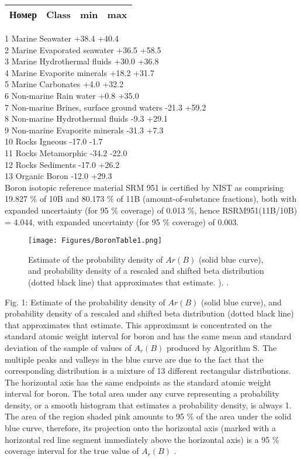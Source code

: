 \documentclass[a5paper,openany]{book}
\begin{document}
\begin{tabular}{cccc}
	Номер & Class &
	min & max \\
	\hline
\end{tabular}
1 Marine Seawater +38.4 +40.4 \\
2 Marine Evaporated seawater +36.5 +58.5\\
3 Marine Hydrothermal fluids +30.0 +36.8\\
4 Marine Evaporite minerals +18.2 +31.7\\
5 Marine Carbonates +4.0 +32.2\\
6 Non-marine Rain water +0.8 +35.0\\
7 Non-marine Brines, surface ground waters -21.3 +59.2\\
8 Non-marine Hydrothermal fluids -9.3 +29.1\\
9 Non-marine Evaporite minerals -31.3 +7.3\\
10 Rocks Igneous -17.0 -1.7\\
11 Rocks Metamorphic -34.2 -22.0\\
12 Rocks Sediments -17.0 +26.2\\
13 Organic Boron -12.0 +29.3\\

Boron isotopic reference material SRM 951 is certified by NIST as comprising 19.827 \% of 10B and 80.173 \% of 11B (amount-of-substance
fractions), both with expanded uncertainty (for 95 \% coverage) of 0.013 \%, hence RSRM951(11B/10B) = 4.044, with expanded
uncertainty (for 95 \% coverage) of 0.003.

\begin{figure}[ht] 
	\centering\small
	\unitlength=1mm
	{\texttt{[image: Figures/BoronTable1.png]}} 
	\caption {Estimate of the probability density of $Ar(B)$ (solid blue curve), and probability density of a rescaled and shifted beta distribution 	(dotted black line) that approximates that estimate. ). \cite{IUPACUncertainty}.} 
	\label{f:BoronTable1}
\end{figure}

Fig. 1: Estimate of the probability density of $Ar(B)$ (solid blue curve), and probability density of a rescaled and shifted beta distribution
(dotted black line) that approximates that estimate. This approximant is concentrated on the standard atomic weight interval for boron
and has the same mean and standard deviation of the sample of values of $A_r(B)$ produced by Algorithm S. The multiple peaks and
valleys in the blue curve are due to the fact that the corresponding distribution is a mixture of 13 different rectangular distributions.
The horizontal axis has the same endpoints as the standard atomic weight interval for boron. The total area under any curve representing
a probability density, or a smooth histogram that estimates a probability density, is always 1. The area of the region shaded pink
amounts to 95 \% of the area under the solid blue curve, therefore, its projection onto the horizontal axis (marked with a horizontal red
line segment immediately above the horizontal axis) is a 95 \% coverage interval for the true value of $A_r(B)$ .
\end{document}
